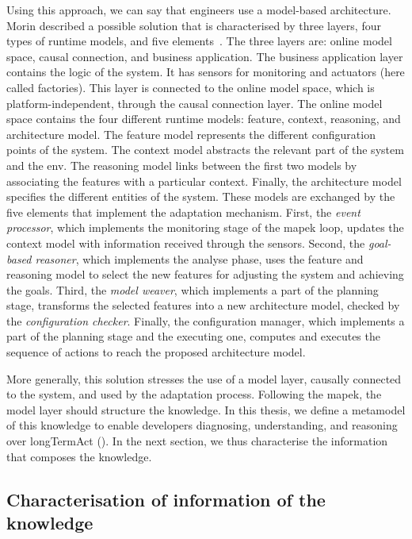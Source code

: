 Using this approach, we can say that engineers use a model-based architecture.
Morin \etal described a possible solution that is characterised by three layers, four types of runtime models, and five elements~\cite{DBLP:journals/computer/MorinBJFS09}.
The three layers are: online model space, causal connection, and business application.
The business application layer contains the logic of the system.
It has sensors for monitoring and actuators (here called factories).
This layer is connected to the online model space, which is platform-independent, through the causal connection layer.
The online model space contains the four different runtime models: feature, context, reasoning, and architecture model.
The feature model represents the different configuration points of the system.
The context model abstracts the relevant part of the system and the \gls{env}.
The reasoning model links between the first two models by associating the features with a particular context.
Finally, the architecture model specifies the different entities of the system.
These models are exchanged by the five elements that implement the adaptation mechanism.
First, the \textit{event processor}, which implements the monitoring stage of the \gls{mapek} loop, updates the context model with information received through the sensors.
Second, the \textit{goal-based reasoner}, which implements the analyse phase, uses the feature and reasoning model to select the new features for adjusting the system and achieving the goals.
Third, the \textit{model weaver}, which implements a part of the planning stage, transforms the selected features into a new architecture model, checked by the \textit{configuration checker}.
Finally, the configuration manager, which implements a part of the planning stage and the executing one, computes and executes the sequence of actions to reach the proposed architecture model.

More generally, this solution stresses the use of a model layer, causally connected to the system, and used by the adaptation process.
Following the \gls{mapek}, the model layer should structure the knowledge.
In this thesis, we define a metamodel of this knowledge to enable developers diagnosing, understanding, and reasoning over \gls{longTermAct} (\cf {}).
In the next section, we thus characterise the information that composes the knowledge.

\subsection{Characterisation of information of the knowledge}

